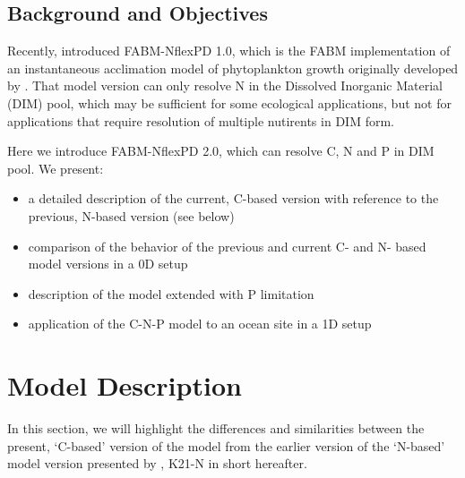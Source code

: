 \documentclass[gmd, manuscript]{copernicus}
\begin{document}
\subsection{Background and Objectives}
Recently, \citet{Kerimoglu2021} introduced FABM-NflexPD 1.0, which is the FABM \citep[Framework for Aquatic Biogeochemical Models][]{Bruggeman2014} implementation of an instantaneous acclimation model of phytoplankton growth originally developed by \citet{Smith2016}. That model version can only resolve N in the Dissolved Inorganic Material (DIM) pool, which may be sufficient for some ecological applications, but not for applications that require resolution of multiple nutirents in DIM form.

Here we introduce FABM-NflexPD 2.0, which can resolve C, N and P in DIM pool. We present:
\begin{itemize}
 \item a detailed description of the current, C-based version with reference to the previous, N-based version (see below) 
 \item comparison of the behavior of the previous and current C- and N- based model versions in a 0D setup
 \item description of the model extended with P limitation
 \item application of the C-N-P model to an ocean site in a 1D setup
\end{itemize}


\section{Model Description}
In this section, we will highlight the differences and similarities between the present, `C-based' version of the model from the earlier version of the `N-based' model version presented by \citet{Kerimoglu2021}, K21-N in short hereafter.
\end{document}
